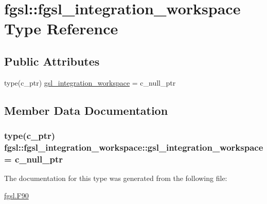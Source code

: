 \hypertarget{structfgsl_1_1fgsl__integration__workspace}{}\section{fgsl\+:\+:fgsl\+\_\+integration\+\_\+workspace Type Reference}
\label{structfgsl_1_1fgsl__integration__workspace}
\subsection*{Public Attributes}
\begin{DoxyCompactItemize}
\item 
type(c\+\_\+ptr) \hyperlink{structfgsl_1_1fgsl__integration__workspace_ac3ed878e23d5dbe66978795ca92bb996}{gsl\+\_\+integration\+\_\+workspace} = c\+\_\+null\+\_\+ptr
\end{DoxyCompactItemize}


\subsection{Member Data Documentation}
\hypertarget{structfgsl_1_1fgsl__integration__workspace_ac3ed878e23d5dbe66978795ca92bb996}{}
\subsubsection[{gsl\+\_\+integration\+\_\+workspace}]{\setlength{\rightskip}{0pt plus 5cm}type(c\+\_\+ptr) fgsl\+::fgsl\+\_\+integration\+\_\+workspace\+::gsl\+\_\+integration\+\_\+workspace = c\+\_\+null\+\_\+ptr}\label{structfgsl_1_1fgsl__integration__workspace_ac3ed878e23d5dbe66978795ca92bb996}


The documentation for this type was generated from the following file\+:\begin{DoxyCompactItemize}
\item 
\hyperlink{fgsl_8F90}{fgsl.\+F90}\end{DoxyCompactItemize}
